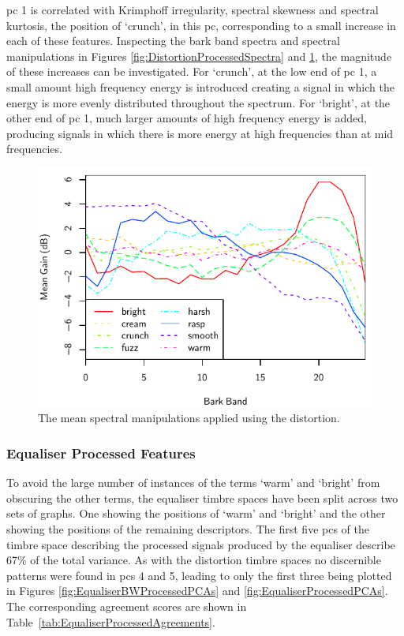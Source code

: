 			\acrshort{pc} 1 is correlated with Krimphoff irregularity, spectral skewness and spectral kurtosis,
			the position of `crunch', in this \acrshort{pc}, corresponding to a small increase in each of these
			features.  Inspecting the bark band spectra and spectral manipulations in Figures
			\ref{fig:DistortionProcessedSpectra} and \ref{fig:DistortionDifferenceSpectra}, the magnitude of
			these increases can be investigated. For `crunch', at the low end of \acrshort{pc} 1, a small
			amount high frequency energy is introduced creating a signal in which the energy is more evenly
			distributed throughout the spectrum. For `bright', at the other end of \acrshort{pc} 1, much larger
			amounts of high frequency energy is added, producing signals in which there is more energy at high
			frequencies than at mid frequencies.

			\begin{figure}[h!]
				\centering
				\includegraphics{chapter4/Images/DistortionDifferenceSpectra.pdf}
				\caption{The mean spectral manipulations applied using the distortion.}
				\label{fig:DistortionDifferenceSpectra}
			\end{figure}

		\subsubsection*{Equaliser Processed Features}
			To avoid the large number of instances of the terms `warm' and `bright' from obscuring the other
			terms, the equaliser timbre spaces have been split across two sets of graphs. One showing the
			positions of `warm' and `bright' and the other showing the positions of the remaining descriptors.
			The first five \acrshort{pc}s of the timbre space describing the processed signals produced by the
			equaliser describe 67\% of the total variance. As with the distortion timbre spaces no discernible
			patterns were found in \acrshort{pc}s 4 and 5, leading to only the first three being plotted in
			Figures \ref{fig:EqualiserBWProcessedPCAs} and \ref{fig:EqualiserProcessedPCAs}. The corresponding
			agreement scores are shown in Table~\ref{tab:EqualiserProcessedAgreements}.

